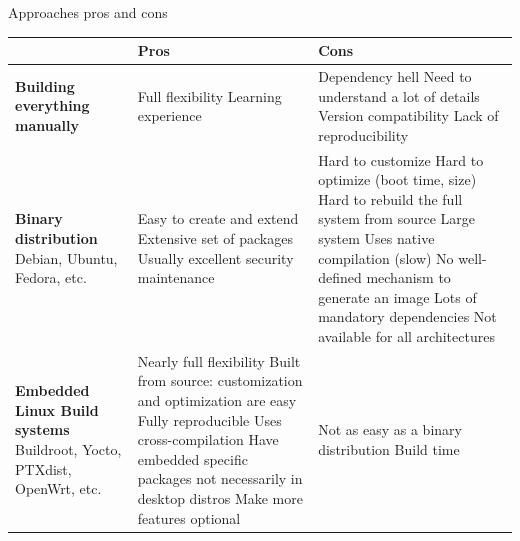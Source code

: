 \begin{frame}{Approaches pros and cons}
  \begin{center}
  \tiny
  \begin{tabularx}{13cm}{|X|X|X|}
    \hline
    & {\bf Pros} & {\bf Cons} \\
    \hline
    {\bf Building everything manually} &
    Full flexibility \newline
    Learning experience &
    Dependency hell \newline
    Need to understand a lot of details \newline
    Version compatibility \newline
    Lack of reproducibility \\
    \hline
    {\bf Binary distribution} \newline Debian, Ubuntu, Fedora, etc.
    &
    Easy to create and extend \newline
    Extensive set of packages \newline
    Usually excellent security maintenance
    &
    Hard to customize \newline
    Hard to optimize (boot time, size) \newline
    Hard to rebuild the full system from source \newline
    Large system \newline
    Uses native compilation (slow) \newline
    No well-defined mechanism to generate an image \newline
    Lots of mandatory dependencies \newline
    Not available for all architectures \\
    \hline
    {\bf Embedded Linux Build systems} \newline Buildroot, Yocto, PTXdist, OpenWrt, etc.
    &
    Nearly full flexibility \newline
    Built from source: customization and optimization are easy \newline
    Fully reproducible \newline
    Uses cross-compilation \newline
    Have embedded specific packages not necessarily in desktop distros \newline
    Make more features optional
    &
    Not as easy as a binary distribution \newline
    Build time \\
    \hline
  \end{tabularx}
  \end{center}
\end{frame}

